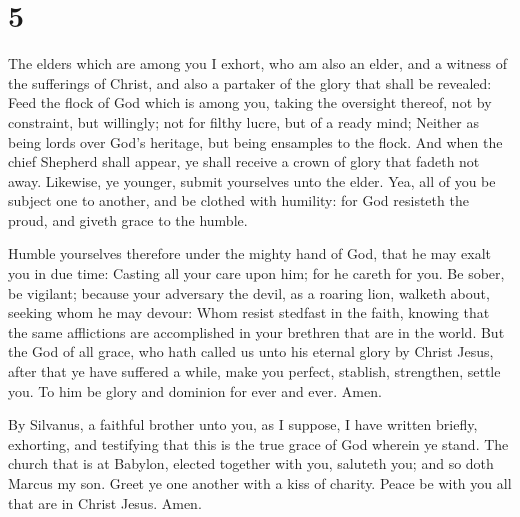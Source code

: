 \hypertarget{section-4}{%
\section{5}\label{section-4}}

 The elders which are among you I exhort, who am also an
elder, and a witness of the sufferings of Christ, and also a partaker of
the glory that shall be revealed:  Feed the flock of God
which is among you, taking the oversight thereof, not by constraint, but
willingly; not for filthy lucre, but of a ready mind; 
Neither as being lords over God's heritage, but being ensamples to the
flock.  And when the chief Shepherd shall appear, ye shall
receive a crown of glory that fadeth not away.  Likewise,
ye younger, submit yourselves unto the elder. Yea, all of you be subject
one to another, and be clothed with humility: for God resisteth the
proud, and giveth grace to the humble.

 Humble yourselves therefore under the mighty hand of God,
that he may exalt you in due time:  Casting all your care
upon him; for he careth for you.  Be sober, be vigilant;
because your adversary the devil, as a roaring lion, walketh about,
seeking whom he may devour:  Whom resist stedfast in the
faith, knowing that the same afflictions are accomplished in your
brethren that are in the world.  But the God of all
grace, who hath called us unto his eternal glory by Christ Jesus, after
that ye have suffered a while, make you perfect, stablish, strengthen,
settle you.  To him be glory and dominion for ever and
ever. Amen.

 By Silvanus, a faithful brother unto you, as I suppose,
I have written briefly, exhorting, and testifying that this is the true
grace of God wherein ye stand.  The church that is at
Babylon, elected together with you, saluteth you; and so doth Marcus my
son.  Greet ye one another with a kiss of charity. Peace
be with you all that are in Christ Jesus. Amen.
